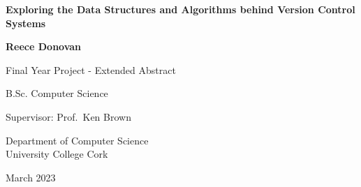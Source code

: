 \documentclass[a4paper,12pt]{article}
\begin{document}

\begin{titlepage}
  \begin{center}
    \vspace*{\fill}









    \textbf{\LARGE{Exploring the Data Structures and Algorithms behind Version Control Systems}}

    \vspace{1.3cm}
    \textbf{\Large{Reece Donovan}}

    \vspace{1.3cm}
    \large{Final Year Project - Extended Abstract}

    \large{B.Sc. Computer Science}

    \vspace{1.4cm}
    \large{Supervisor: Prof.\ Ken Brown}

    \vspace{1.45cm}

    \normalsize{Department of Computer Science}\\
    \normalsize{University College Cork}

    \vspace{1.5cm}
    \large{March 2023}


    \vspace*{\fill}
  \end{center}
\end{titlepage}
\end{document}
